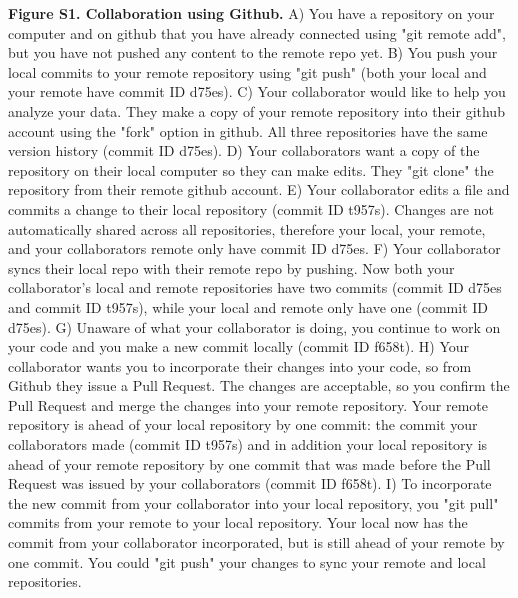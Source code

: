 \textbf{Figure S1. Collaboration using Github.} A) You have a repository on your computer and on github that you have already connected using "git remote add", but you have not pushed any content to the remote repo yet. B) You push your local commits to your remote repository using "git push" (both your local and your remote have commit ID d75es). C) Your collaborator would like to help you analyze your data. They make a copy of your remote repository into their github account using the "fork" option in github. All three repositories have the same version history (commit ID d75es). D) Your collaborators want a copy of the repository on their local computer so they can make edits. They "git clone" the repository from their remote github account. E) Your collaborator edits a file and commits a change to their local repository (commit ID t957s). Changes are not automatically shared across all repositories, therefore your local, your remote, and your collaborators remote only have commit ID d75es. F) Your collaborator syncs their local repo with their remote repo by pushing. Now both your collaborator's local and remote repositories have two commits (commit ID d75es and commit ID t957s), while your local and remote only have one (commit ID d75es). G) Unaware of what your collaborator is doing, you continue to work on your code and you make a new commit locally (commit ID f658t). H) Your collaborator wants you to incorporate their changes into your code, so from Github they issue a Pull Request. The changes are acceptable, so you confirm the Pull Request and merge the changes into your remote repository. Your remote repository is ahead of your local repository by one commit: the commit your collaborators made (commit ID t957s) and in addition your local repository is ahead of your remote repository by one commit that was made before the Pull Request was issued by your collaborators (commit ID f658t). I) To incorporate the new commit from your collaborator into your local repository, you "git pull" commits from your remote to your local repository. Your local now has the commit from your collaborator incorporated, but is still ahead of your remote by one commit. You could "git push" your changes to sync your remote and local repositories. 